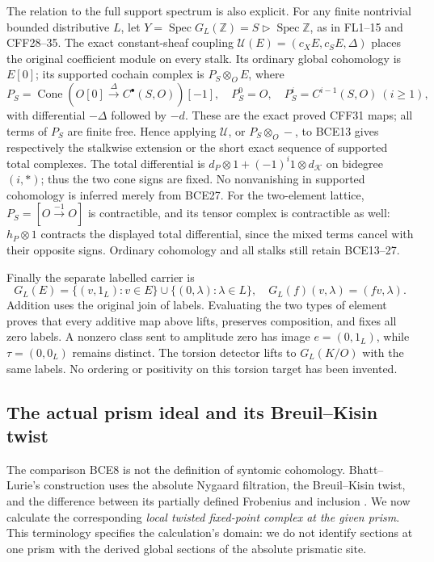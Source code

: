 The relation to the full support spectrum is also explicit.
For any finite nontrivial bounded distributive \(L\), let
\(Y=\operatorname{Spec}G_L(\mathbb Z)=S\triangleright
\operatorname{Spec}\mathbb Z\), as in FL1--15 and CFF28--35.
The exact constant-sheaf coupling
\(\mathcal U(E)=(c_XE,c_SE,\Delta)\) places the original
coefficient module on every stalk. Its ordinary global
cohomology is \(E[0]\); its supported cochain complex is
\(P_S\otimes_OE\), where
\[
P_S=\operatorname{Cone}(O[0]\xrightarrow{\Delta}C^\bullet(S,O))[-1],
\quad P_S^0=O,\quad P_S^i=C^{i-1}(S,O)\ (i\ge1),
\]
with differential \(-\Delta\) followed by \(-d\).
These are the exact proved CFF31 maps; all terms of \(P_S\)
are finite free. Hence applying \(\mathcal U\), or
\(P_S\otimes_O-\), to BCE13 gives respectively the stalkwise
extension or the short exact sequence of supported total
complexes. The total differential is
\(d_P\otimes1+(-1)^i1\otimes d_{\mathcal K}\) on bidegree
\((i,*)\); thus the two cone signs are fixed.
No nonvanishing in supported cohomology is inferred merely
from BCE27. For the two-element lattice,
\(P_S=[O\xrightarrow{-1}O]\) is contractible, and its tensor
complex is contractible as well: \(h_P\otimes1\) contracts
the displayed total differential, since the mixed terms
cancel with their opposite signs. Ordinary cohomology and
all stalks still retain BCE13--27.

Finally the separate labelled carrier is
\begin{equation}\tag{BCE28}
G_L(E)=\{(v,1_L):v\in E\}\cup\{(0,\lambda):\lambda\in L\},
\quad G_L(f)(v,\lambda)=(fv,\lambda).
\end{equation}
Addition uses the original join of labels. Evaluating the two
types of element proves that every additive map above lifts,
preserves composition, and fixes all zero labels. A nonzero
class sent to amplitude zero has image \(e=(0,1_L)\), while
\(\tau=(0,0_L)\) remains distinct. The torsion detector lifts
to \(G_L(K/O)\) with the same labels. No ordering or positivity
on this torsion target has been invented.

\subsection{The actual prism ideal and its Breuil--Kisin twist}

The comparison BCE8 is not the definition of syntomic cohomology.
Bhatt--Lurie's construction uses the absolute Nygaard filtration,
the Breuil--Kisin twist, and the difference between its partially
defined Frobenius and inclusion \cite{BCEBL}. We now calculate the
corresponding \emph{local twisted fixed-point complex at the given
prism}. This terminology specifies the calculation's domain:
we do not identify sections at one prism with the derived global
sections of the absolute prismatic site.

